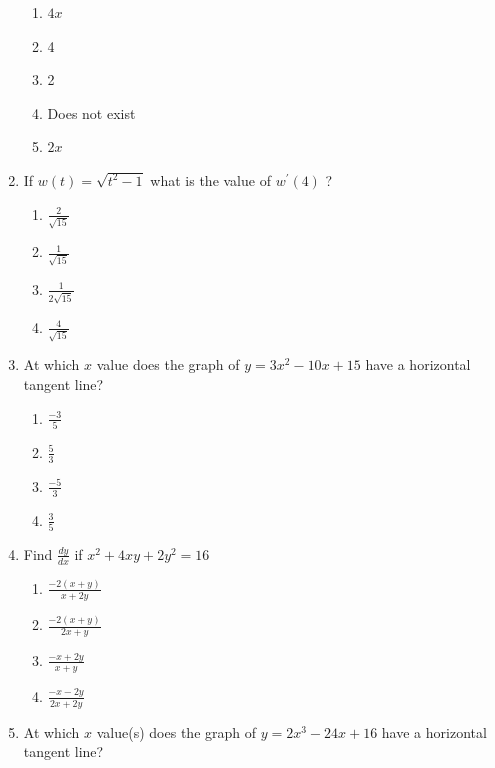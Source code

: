 \documentclass{article}
\begin{document}
\begin{enumerate}
\begin{minipage}[t]{\linewidth}
		\begin{enumerate}
		\setlength\itemsep{2em}
			\item  $4 x$ 
			\item  4 
			\item  2 
			\item  Does not exist 
			\item  $2 x$ 
		\end{enumerate}
	\end{minipage}
	\item
	\begin{minipage}[t]{\linewidth}
		If \(w(t)=\sqrt{t^{2}-1}\) what is the value of \(w^{\prime}(4)\) ?


		\vspace{1em}

		\begin{enumerate}
		\setlength\itemsep{2em}
			\item  $\frac{2}{\sqrt{15}}$ 
			\item  $\frac{1}{\sqrt{15}}$ 
			\item  $\frac{1}{2 \sqrt{15}}$ 
			\item  $\frac{4}{\sqrt{15}}$ 
		\end{enumerate}
	\end{minipage}
	\item
	\begin{minipage}[t]{\linewidth}
		At which \(x\) value does the graph of \(y=3 x^{2}-10 x+15\) have a
horizontal tangent line?


		\vspace{1em}

		\begin{enumerate}
		\setlength\itemsep{2em}
			\item  $\frac{-3}{5}$ 
			\item  $\frac{5}{3}$ 
			\item  $\frac{-5}{3}$ 
			\item  $\frac{3}{5}$ 
		\end{enumerate}
	\end{minipage}
	\item
	\begin{minipage}[t]{\linewidth}
		Find \(\frac{d y}{d x}\) if \(x^{2}+4 x y+2 y^{2}=16\)


		\vspace{1em}

		\begin{enumerate}
		\setlength\itemsep{2em}
			\item  $\frac{-2(x+y)}{x+2 y}$ 
			\item  $\frac{-2(x+y)}{2 x+y}$ 
			\item  $\frac{-x+2 y}{x+y}$ 
			\item  $\frac{-x-2 y}{2 x+2 y}$ 
		\end{enumerate}
	\end{minipage}
	\item
	\begin{minipage}[t]{\linewidth}
		At which \(x\) value(s) does the graph of \(y=2 x^{3}-24 x+16\) have a
horizontal tangent line?



\end{minipage}
\end{enumerate}
\end{document}
